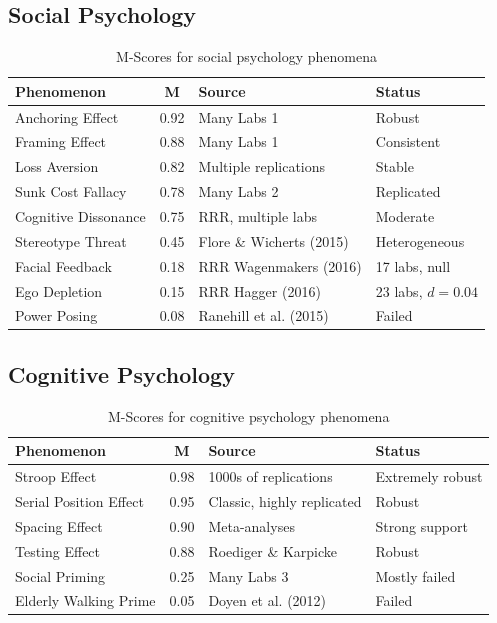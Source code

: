 \subsection{Social Psychology}

\begin{table}[H]
\centering
\small
\begin{tabular}{lcll}
\toprule
\textbf{Phenomenon} & \textbf{M} & \textbf{Source} & \textbf{Status} \\
\midrule
Anchoring Effect & 0.92 & Many Labs 1 & Robust \\
Framing Effect & 0.88 & Many Labs 1 & Consistent \\
Loss Aversion & 0.82 & Multiple replications & Stable \\
Sunk Cost Fallacy & 0.78 & Many Labs 2 & Replicated \\
Cognitive Dissonance & 0.75 & RRR, multiple labs & Moderate \\
Stereotype Threat & 0.45 & Flore \& Wicherts (2015) & Heterogeneous \\
Facial Feedback & 0.18 & RRR Wagenmakers (2016) & 17 labs, null \\
Ego Depletion & 0.15 & RRR Hagger (2016) & 23 labs, $d = 0.04$ \\
Power Posing & 0.08 & Ranehill et al. (2015) & Failed \\
\bottomrule
\end{tabular}
\caption{M-Scores for social psychology phenomena}
\end{table}


\subsection{Cognitive Psychology}

\begin{table}[H]
\centering
\small
\begin{tabular}{lcll}
\toprule
\textbf{Phenomenon} & \textbf{M} & \textbf{Source} & \textbf{Status} \\
\midrule
Stroop Effect & 0.98 & 1000s of replications & Extremely robust \\
Serial Position Effect & 0.95 & Classic, highly replicated & Robust \\
Spacing Effect & 0.90 & Meta-analyses & Strong support \\
Testing Effect & 0.88 & Roediger \& Karpicke & Robust \\
Social Priming & 0.25 & Many Labs 3 & Mostly failed \\
Elderly Walking Prime & 0.05 & Doyen et al. (2012) & Failed \\
\bottomrule
\end{tabular}
\caption{M-Scores for cognitive psychology phenomena}
\end{table}


